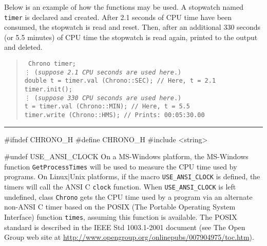 Below is an example of how the functions may be used.
A stopwatch named \texttt{timer} is declared and created.
After 2.1 seconds of CPU time have been consumed, the stopwatch is read and
reset. Then, after an additional 330 seconds (or 5.5 minutes) of CPU time
the stopwatch is read again, printed to the output and deleted.
%
 \begin{verse}{\tt
  Chrono timer; \\
\hskip 1.0cm   \vdots 
\hskip 1.0cm  (\emph{suppose 2.1 CPU seconds are used here}.)\\[6pt]
  double t = timer.val (Chrono::SEC); \qquad   // Here, t = 2.1 \\
  timer.init(); \\
\hskip 1.0cm  \vdots
\hskip 1.0cm (\emph{suppose 330 CPU seconds are used here}.) \\[10pt]
  t = timer.val (Chrono::MIN); \qquad    // Here, t = 5.5 \\
  timer.write (Chrono::HMS);  \qquad     // Prints: 00:05:30.00 \\
 }\end{verse}



\bigskip\hrule
\code\hide
#ifndef CHRONO_H
#define CHRONO_H 
\endhide
#include <string>

#undef USE_ANSI_CLOCK
\endcode
  \tab
  On a MS-Windows platform,
  the MS-Windows function \texttt{GetProcessTimes} will be used to measure
  the CPU time used by programs.
  On Linux$|$Unix platforms, if the macro
  \texttt{USE\_ANSI\_CLOCK} is defined, the timers %
  will call the ANSI C  \texttt{clock} function.
  When \texttt{USE\_ANSI\_CLOCK} is left undefined, class
  \texttt{Chrono} gets the CPU time used by a program via an 
  alternate non-ANSI C timer 
  based on the POSIX (The Portable Operating System Interface)
  function \texttt{times}, assuming this function is available. The POSIX
  standard is described in the IEEE Std 1003.1-2001 document (see 
  The Open Group web site at
  \url{http://www.opengroup.org/onlinepubs/007904975/toc.htm}).
 \endtab
\code


